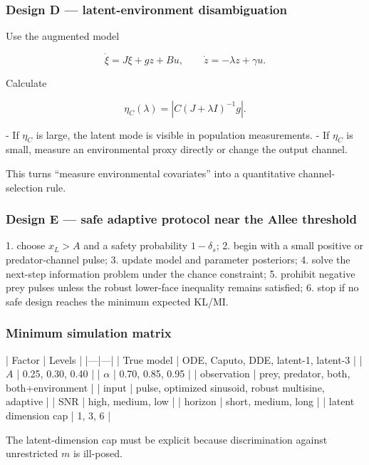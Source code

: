 \subsubsection{Design D --- latent-environment disambiguation}

Use the augmented model

\[
\dot\xi=J\xi+gz+Bu,
\qquad \dot z=-\lambda z+\gamma u.
\]

Calculate

\[
\eta_C(\lambda)=|C(J+\lambda I)^{-1}g|.
\]

- If \(\eta_C\) is large, the latent mode is visible in population measurements.
- If \(\eta_C\) is small, measure an environmental proxy directly or change the output channel.

This turns “measure environmental covariates” into a quantitative channel-selection rule.

\subsubsection{Design E --- safe adaptive protocol near the Allee threshold}

1. choose \(x_L>A\) and a safety probability \(1-\delta_s\);
2. begin with a small positive or predator-channel pulse;
3. update model and parameter posteriors;
4. solve the next-step information problem under the chance constraint;
5. prohibit negative prey pulses unless the robust lower-face inequality remains satisfied;
6. stop if no safe design reaches the minimum expected KL/MI.

\subsubsection{Minimum simulation matrix}

| Factor | Levels |
|---|---|
| True model | ODE, Caputo, DDE, latent-1, latent-3 |
| \(A\) | 0.25, 0.30, 0.40 |
| \(\alpha\) | 0.70, 0.85, 0.95 |
| observation | prey, predator, both, both+environment |
| input | pulse, optimized sinusoid, robust multisine, adaptive |
| SNR | high, medium, low |
| horizon | short, medium, long |
| latent dimension cap | 1, 3, 6 |

The latent-dimension cap must be explicit because discrimination against unrestricted \(m\) is ill-posed.
